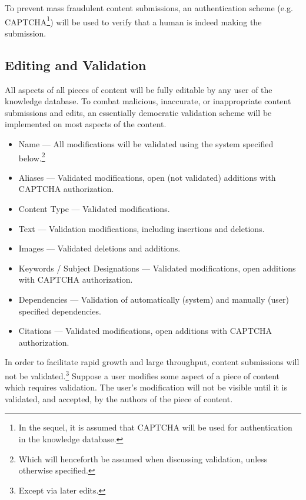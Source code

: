 \documentclass[12pt,letterpaper]{article}
\begin{document}
To prevent mass fraudulent content submissions, an authentication scheme (e.g. CAPTCHA\footnote{In the sequel, it is assumed that CAPTCHA will be used for authentication in the knowledge database.}) will be used to verify that a human is indeed making the submission.  



\subsection{Editing and Validation}

All aspects of all pieces of content will be fully editable by any user of the knowledge database. To combat malicious, inaccurate, or inappropriate content submissions and edits, an essentially democratic validation scheme will be implemented on most aspects of the content. 

\begin{itemize}
\item Name --- All modifications will be validated using the system specified below.\footnote{Which will henceforth be assumed when discussing validation, unless otherwise specified.}
\item Aliases --- Validated modifications, open (not validated) additions with CAPTCHA authorization.
\item Content Type --- Validated modifications. 
\item Text --- Validation modifications, including insertions and deletions.
\item Images --- Validated deletions and additions. 
\item Keywords / Subject Designations --- Validated modifications, open additions with CAPTCHA authorization.
\item Dependencies --- Validation of automatically (system) and manually (user) specified dependencies. 
\item Citations --- Validated modifications, open additions with CAPTCHA authorization.
\end{itemize}

In order to facilitate rapid growth and large throughput, content submissions will not be validated.\footnote{Except via later edits.} Suppose a user modifies some aspect of a piece of content which requires validation. The user's modification will not be visible until it is validated, and accepted, by the authors of the piece of content. 
\end{document}
